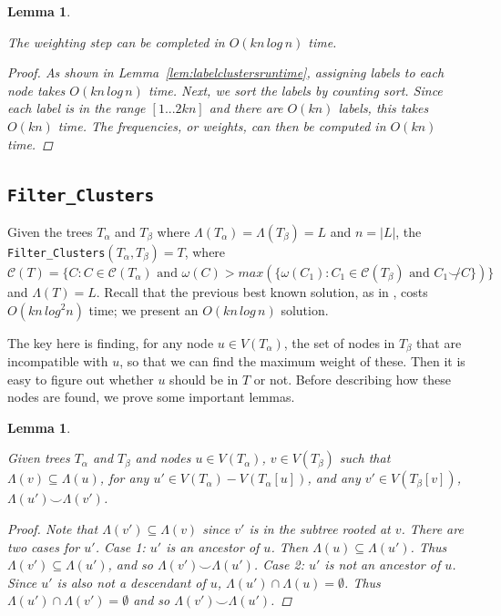 \documentclass{article}
\newcommand{\compatible}{\smile}
\newcommand{\leafset}{\Lambda}
\newcommand{\weight}{\omega}
\newtheorem{weightingruntime}[incompatibility]{Lemma}
\newtheorem{filterclusterssubsetcompatible}[incompatibility]{Lemma}
\begin{document}
    \medskip
    \begin{weightingruntime}
        \label{lem:weightingruntime}

        The weighting step can be completed in $O(kn\,log\,n)$ time.

        \begin{proof}
            As shown in Lemma~\ref{lem:labelclustersruntime}, assigning labels to each node takes $O(kn\,log\,n)$ time. Next, we sort the labels by counting sort. Since each label is in the range $[1 ... 2kn]$ and there are $O(kn)$ labels, this takes $O(kn)$ time. The frequencies, or weights, can then be computed in $O(kn)$ time.
        \end{proof}
    \end{weightingruntime}

    \subsection{\texttt{Filter\_Clusters}}
    \label{subsec:filterclusters}

    Given the trees $T_\alpha$ and $T_\beta$ where $\leafset(T_\alpha) = \leafset(T_\beta) = L$ and $n = |L|$, the \texttt{Filter\_Clusters}$(T_\alpha, T_\beta) = T$, where $\mathcal{C}(T) = \{C : C \in \mathcal{C}(T_\alpha) \text{ and } \weight(C) > max(\{\weight(C_1) : C_1 \in \mathcal{C}(T_\beta) \text{ and } C_1 \not\compatible C\})\}$ and $\leafset(T) = L$. Recall that the previous best known solution, as in \cite{jansson2018algorithms}, costs $O(kn\,log^2n)$ time; we present an $O(kn\,log\,n)$ solution.

    The key here is finding, for any node $u \in V(T_\alpha)$, the set of nodes in $T_\beta$ that are incompatible with $u$, so that we can find the maximum weight of these. Then it is easy to figure out whether $u$ should be in $T$ or not. Before describing how these nodes are found, we prove some important lemmas.
    \newline

    \begin{filterclusterssubsetcompatible}
        \label{lem:filterclusterssubsetcompatible}

        Given trees $T_\alpha$ and $T_\beta$ and nodes $u \in V(T_\alpha)$, $v \in V(T_\beta)$ such that $\leafset(v) \subseteq \leafset(u)$, for any $u' \in V(T_\alpha) - V(T_\alpha[u])$, and any $v' \in V(T_\beta[v])$, $\leafset(u') \compatible \leafset(v')$.

        \begin{proof}
            Note that $\leafset(v') \subseteq \leafset(v)$ since $v'$ is in the subtree rooted at $v$. There are two cases for $u'$. \textit{Case 1}: $u'$ is an ancestor of $u$. Then $\leafset(u) \subseteq \leafset(u')$. Thus $\leafset(v') \subseteq \leafset(u')$, and so $\leafset(v') \compatible \leafset(u')$. \textit{Case 2}: $u'$ is not an ancestor of $u$. Since $u'$ is also not a descendant of $u$, $\leafset(u') \cap \leafset(u) = \emptyset$. Thus $\leafset(u') \cap \leafset(v') = \emptyset$ and so $\leafset(v') \compatible \leafset(u')$.
        \end{proof}
    \end{filterclusterssubsetcompatible}
\end{document}
